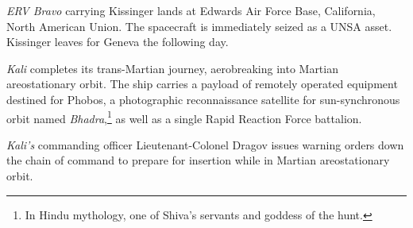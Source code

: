 {\it ERV Bravo} carrying Kissinger lands at Edwards Air Force Base, California, North American Union. The spacecraft is immediately seized as a UNSA asset. Kissinger leaves for Geneva the following day.
\StopTimelineDate

{\it Kali} completes its trans-Martian journey, aerobreaking into Martian areostationary orbit. The ship carries a payload of remotely operated equipment destined for Phobos, a photographic reconnaissance satellite for sun-synchronous orbit named {\it Bhadra},\footnote{In Hindu mythology, one of Shiva's servants and goddess of the hunt.} as well as a single Rapid Reaction Force battalion.
\StopTimelineDate

{\it Kali's} commanding officer Lieutenant-Colonel Dragov issues warning orders down the chain of command to prepare for insertion while in Martian areostationary orbit.
\StopTimelineDate


